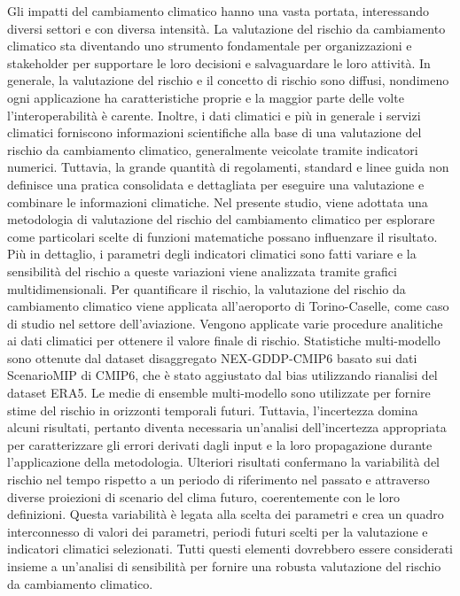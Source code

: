 Gli impatti del cambiamento climatico hanno una vasta portata, interessando diversi settori e con diversa intensità. La valutazione del rischio da cambiamento climatico sta diventando uno strumento fondamentale per organizzazioni e stakeholder per supportare le loro decisioni e salvaguardare le loro attività. In generale, la valutazione del rischio e il concetto di rischio sono diffusi, nondimeno ogni applicazione ha caratteristiche proprie e la maggior parte delle volte l'interoperabilità è carente. Inoltre, i dati climatici e più in generale i servizi climatici forniscono informazioni scientifiche alla base di una valutazione del rischio da cambiamento climatico, generalmente veicolate tramite indicatori numerici. Tuttavia, la grande quantità di regolamenti, standard e linee guida non definisce una pratica consolidata e dettagliata per eseguire una valutazione e combinare le informazioni climatiche. Nel presente studio, viene adottata una metodologia di valutazione del rischio del cambiamento climatico per esplorare come particolari scelte di funzioni matematiche possano influenzare il risultato. Più in dettaglio, i parametri degli indicatori climatici sono fatti variare e la sensibilità del rischio a queste variazioni viene analizzata tramite grafici multidimensionali. Per quantificare il rischio, la valutazione del rischio da cambiamento climatico viene applicata all'aeroporto di Torino-Caselle, come caso di studio nel settore dell'aviazione. Vengono applicate varie procedure analitiche ai dati climatici per ottenere il valore finale di rischio. Statistiche multi-modello sono ottenute dal dataset disaggregato NEX-GDDP-CMIP6 basato sui dati ScenarioMIP di CMIP6, che è stato aggiustato dal bias utilizzando rianalisi del dataset ERA5. Le medie di ensemble multi-modello sono utilizzate per fornire stime del rischio in orizzonti temporali futuri. Tuttavia, l'incertezza domina alcuni risultati, pertanto diventa necessaria un'analisi dell'incertezza appropriata per caratterizzare gli errori derivati dagli input e la loro propagazione durante l'applicazione della metodologia. Ulteriori risultati confermano la variabilità del rischio nel tempo rispetto a un periodo di riferimento nel passato e attraverso diverse proiezioni di scenario del clima futuro, coerentemente con le loro definizioni. Questa variabilità è legata alla scelta dei parametri e crea un quadro interconnesso di valori dei parametri, periodi futuri scelti per la valutazione e indicatori climatici selezionati. Tutti questi elementi dovrebbero essere considerati insieme a un'analisi di sensibilità per fornire una robusta valutazione del rischio da cambiamento climatico.
